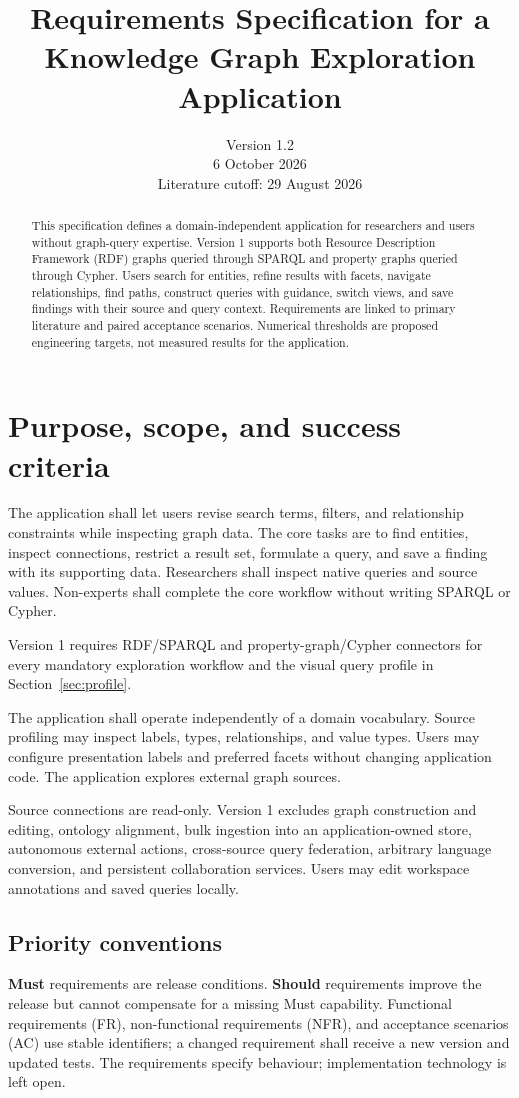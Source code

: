 \documentclass[11pt,a4paper]{article}
\title{Requirements Specification for a\\Knowledge Graph Exploration Application}
\author{}
\date{Version 1.2\\6 October 2026\\Literature cutoff: 29 August 2026}
\begin{document}
\maketitle
\begin{abstract}
This specification defines a domain-independent application for researchers and users without graph-query expertise. Version 1 supports both Resource Description Framework (RDF) graphs queried through SPARQL and property graphs queried through Cypher. Users search for entities, refine results with facets, navigate relationships, find paths, construct queries with guidance, switch views, and save findings with their source and query context. Requirements are linked to primary literature and paired acceptance scenarios. Numerical thresholds are proposed engineering targets, not measured results for the application.
\end{abstract}
\tableofcontents
\newpage

\section{Purpose, scope, and success criteria}
The application shall let users revise search terms, filters, and relationship constraints while inspecting graph data. The core tasks are to find entities, inspect connections, restrict a result set, formulate a query, and save a finding with its supporting data. Researchers shall inspect native queries and source values. Non-experts shall complete the core workflow without writing SPARQL or Cypher.

Version 1 requires RDF/SPARQL and property-graph/Cypher connectors for every mandatory exploration workflow and the visual query profile in Section~\ref{sec:profile}.

The application shall operate independently of a domain vocabulary. Source profiling may inspect labels, types, relationships, and value types. Users may configure presentation labels and preferred facets without changing application code. The application explores external graph sources.

Source connections are read-only. Version 1 excludes graph construction and editing, ontology alignment, bulk ingestion into an application-owned store, autonomous external actions, cross-source query federation, arbitrary language conversion, and persistent collaboration services. Users may edit workspace annotations and saved queries locally.

\subsection{Priority conventions}
\textbf{Must} requirements are release conditions. \textbf{Should} requirements improve the release but cannot compensate for a missing Must capability. Functional requirements (FR), non-functional requirements (NFR), and acceptance scenarios (AC) use stable identifiers; a changed requirement shall receive a new version and updated tests. The requirements specify behaviour; implementation technology is left open.
\end{document}
